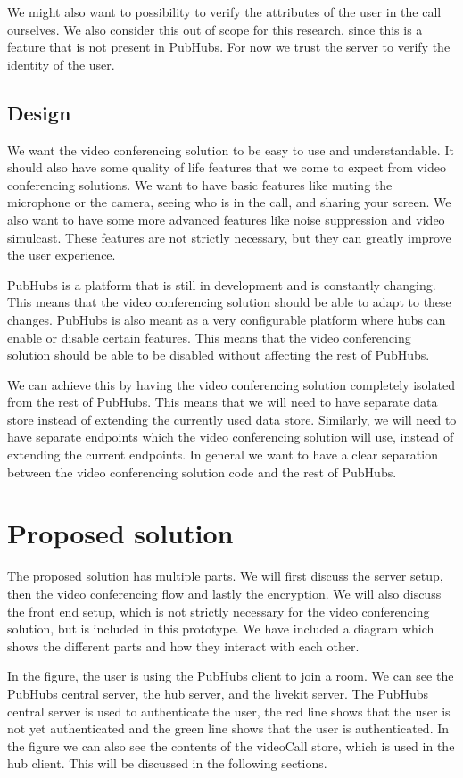 \documentclass{report}
\begin{document}
We might also want to possibility to verify the attributes of the user in the call ourselves. We also consider this out
of scope for this research, since this is a feature that is not present in PubHubs. For now we trust the server to
verify the identity of the user.

\section{Design}
We want the video conferencing solution to be easy to use and understandable. It should also have some quality of life
features that we come to expect from video conferencing solutions. We want to have basic features like muting the
microphone or the camera, seeing who is in the call, and sharing your screen. We also want to have some more advanced
features like noise suppression and video simulcast. These features are not strictly necessary, but they can greatly
improve the user experience.

PubHubs is a platform that is still in development and is constantly changing. This means that the video
conferencing solution should be able to adapt to these changes. PubHubs is also meant as a very configurable platform
where hubs can enable or disable certain features. This means that the video conferencing solution should be able to
be disabled without affecting the rest of PubHubs.

We can achieve this by having the video conferencing solution completely isolated from the rest of PubHubs.
This means that we will need to have separate data store instead of extending the currently used data store.
Similarly, we will need to have separate endpoints which the video conferencing solution will use,
instead of extending the current endpoints. In general we want to have a clear separation between the video conferencing
solution code and the rest of PubHubs.

\chapter{Proposed solution}
The proposed solution has multiple parts. We will first discuss the server setup, then the video conferencing flow
and lastly the encryption. We will also discuss the front end setup, which is not strictly necessary for the video
conferencing solution, but is included in this prototype. We have included a diagram which shows the different parts
and how they interact with each other.

In the figure, the user is using the PubHubs client to join a room. We can see the PubHubs central server, the hub
server, and the livekit server. The PubHubs central server is used to authenticate the user, the red line shows that
the user is not yet authenticated and the green line shows that the user is authenticated. In the figure we can also see
the contents of the videoCall store, which is used in the hub client. This will be discussed in the following sections.
\end{document}
